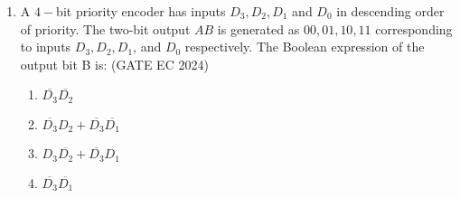 \documentclass{article}
\begin{document}
\begin{enumerate}
	\item A $4-$bit priority encoder has inputs $D_{3}, D_{2}, D_{1}$ and $D_{0}$ in descending order of priority. The two-bit output $AB$ is generated as $00, 01, 10, 11$ corresponding to inputs $D_{3}, D_{2}, D_{1}$, and $D_{0}$ respectively. The Boolean expression of the output bit B is:    \hfill(GATE EC 2024)
		\begin{enumerate}
			\item $\overline{D_{3}} \overline{D_{2}}$
			\item $\overline{D_{3}}D_{2} + \overline{D_{3}} \overline{D_{1}}$
			\item $D_{3}\overline{D_{2}} + \overline{D_{3}}D_{1}$
			\item $\overline{D_{3}} \overline{D_{1}}$
		\end{enumerate}
\end{enumerate}
\end{document}
